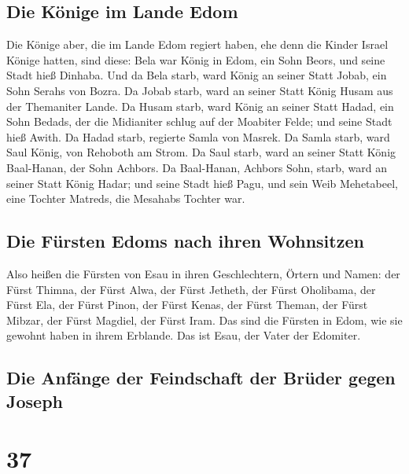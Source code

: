 \hypertarget{die-kuxf6nige-im-lande-edom}{%
\subsection{Die Könige im Lande
Edom}\label{die-kuxf6nige-im-lande-edom}}

 Die Könige aber, die im Lande Edom regiert haben, ehe
denn die Kinder Israel Könige hatten, sind diese:  Bela
war König in Edom, ein Sohn Beors, und seine Stadt hieß Dinhaba.
 Und da Bela starb, ward König an seiner Statt Jobab, ein
Sohn Serahs von Bozra.  Da Jobab starb, ward an seiner
Statt König Husam aus der Themaniter Lande.  Da Husam
starb, ward König an seiner Statt Hadad, ein Sohn Bedads, der die
Midianiter schlug auf der Moabiter Felde; und seine Stadt hieß Awith.
 Da Hadad starb, regierte Samla von Masrek.
 Da Samla starb, ward Saul König, von Rehoboth am Strom.
 Da Saul starb, ward an seiner Statt König Baal-Hanan,
der Sohn Achbors.  Da Baal-Hanan, Achbors Sohn, starb,
ward an seiner Statt König Hadar; und seine Stadt hieß Pagu, und sein
Weib Mehetabeel, eine Tochter Matreds, die Mesahabs Tochter war.

\hypertarget{die-fuxfcrsten-edoms-nach-ihren-wohnsitzen}{%
\subsection{Die Fürsten Edoms nach ihren
Wohnsitzen}\label{die-fuxfcrsten-edoms-nach-ihren-wohnsitzen}}

 Also heißen die Fürsten von Esau in ihren Geschlechtern,
Örtern und Namen: der Fürst Thimna, der Fürst Alwa, der Fürst Jetheth,
 der Fürst Oholibama, der Fürst Ela, der Fürst Pinon,
 der Fürst Kenas, der Fürst Theman, der Fürst Mibzar,
 der Fürst Magdiel, der Fürst Iram. Das sind die Fürsten
in Edom, wie sie gewohnt haben in ihrem Erblande. Das ist Esau, der
Vater der Edomiter.

\hypertarget{die-anfuxe4nge-der-feindschaft-der-bruxfcder-gegen-joseph}{%
\subsection{Die Anfänge der Feindschaft der Brüder gegen
Joseph}\label{die-anfuxe4nge-der-feindschaft-der-bruxfcder-gegen-joseph}}

\hypertarget{section-36}{%
\section{37}\label{section-36}}

